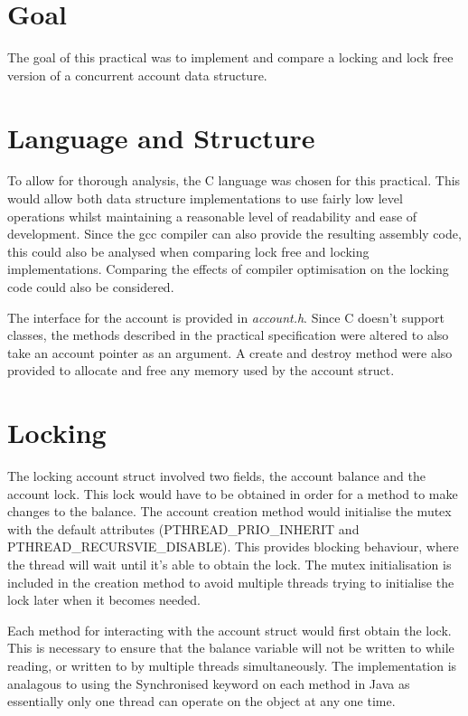 \documentclass[12pt]{article}
\begin{document}
\part*{Goal}

The goal of this practical was to implement and compare a locking and lock free version of a concurrent account data structure.

\part{Language and Structure}

To allow for thorough analysis, the C language was chosen for this practical. This would allow both data structure implementations to use fairly low level operations whilst maintaining a reasonable level of readability and ease of development. Since the gcc compiler can also provide the resulting assembly code, this could also be analysed when comparing lock free and locking implementations. Comparing the effects of compiler optimisation on the locking code could also be considered. 

The interface for the account is provided in \emph{account.h}. Since C doesn't support classes, the methods described in the practical specification were altered to also take an account pointer as an argument. A create and destroy method were also provided to allocate and free any memory used by the account struct.

\part{Locking}

The locking account struct involved two fields, the account balance and the account lock. This lock would have to be obtained in order for a method to make changes to the balance. The account creation method would initialise the mutex with the default attributes (PTHREAD_PRIO_INHERIT and PTHREAD_RECURSVIE_DISABLE). This provides blocking behaviour, where the thread will wait until it's able to obtain the lock. The mutex initialisation is included in the creation method to avoid multiple threads trying to initialise the lock later when it becomes needed.

Each method for interacting with the account struct would first obtain the lock. This is necessary to ensure that the balance variable will not be written to while reading, or written to by multiple threads simultaneously. The implementation is analagous to using the Synchronised keyword on each method in Java as essentially only one thread can operate on the object at any one time. 
\end{document}
